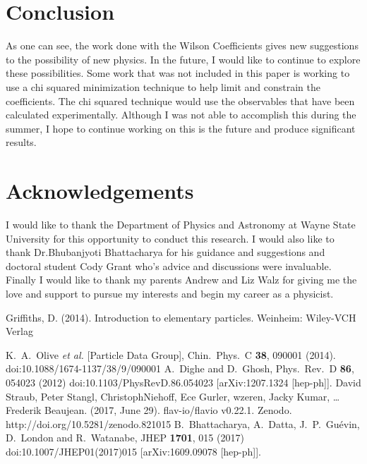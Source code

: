 \documentclass[12pt]{article}
\begin{document}
\section{Conclusion}
As one can see, the work done with the Wilson Coefficients gives new suggestions to the possibility of new physics. In the future, I would like to continue to explore these possibilities. Some work that was not included in this paper is working to use a chi squared minimization technique to help limit and constrain the coefficients. The chi squared technique would use the observables that have been calculated experimentally. Although I was not able to accomplish this during the summer, I hope to continue working on this is the future and produce significant results.
\section{Acknowledgements}
I would like to thank the Department of Physics and Astronomy at Wayne State University for this opportunity to conduct this research. I would also like to thank Dr.Bhubanjyoti Bhattacharya for his guidance and suggestions and doctoral student Cody Grant who's advice and discussions were invaluable. Finally I would like to thank my parents Andrew and Liz Walz for giving me the love and support to pursue my interests and begin my career as a physicist.  
\newpage
\begin{thebibliography}{9}
Griffiths, D. (2014). Introduction to elementary particles. Weinheim: Wiley-VCH Verlag

  K.~A.~Olive {\it et al.} [Particle Data Group],
  Chin.\ Phys.\ C {\bf 38}, 090001 (2014).
  doi:10.1088/1674-1137/38/9/090001
  A.~Dighe and D.~Ghosh,
  Phys.\ Rev.\ D {\bf 86}, 054023 (2012)
  doi:10.1103/PhysRevD.86.054023
  [arXiv:1207.1324 [hep-ph]].
    David Straub, Peter Stangl, ChristophNiehoff, Ece Gurler, wzeren, Jacky Kumar, … Frederik Beaujean. (2017, June 29). flav-io/flavio v0.22.1. Zenodo. http://doi.org/10.5281/zenodo.821015
  B.~Bhattacharya, A.~Datta, J.~P.~Guévin, D.~London and R.~Watanabe,
  JHEP {\bf 1701}, 015 (2017)
  doi:10.1007/JHEP01(2017)015
  [arXiv:1609.09078 [hep-ph]].
\end{thebibliography}
\newpage
\end{document}
